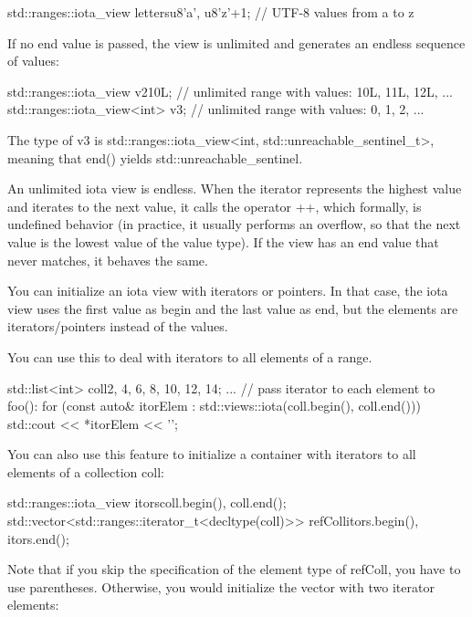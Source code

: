 \begin{cpp}
std::ranges::iota_view letters{u8'a', u8'z'+1}; // UTF-8 values from a to z
\end{cpp}

If no end value is passed, the view is unlimited and generates an endless sequence of values:

\begin{cpp}
std::ranges::iota_view v2{10L}; // unlimited range with values: 10L, 11L, 12L, ...
std::ranges::iota_view<int> v3; // unlimited range with values: 0, 1, 2, ...
\end{cpp}

The type of v3 is std::ranges::iota\_view<int, std::unreachable\_sentinel\_t>, meaning that end() yields std::unreachable\_sentinel.

An unlimited iota view is endless. When the iterator represents the highest value and iterates to the next value, it calls the operator ++, which formally, is undefined behavior (in practice, it usually performs an overflow, so that the next value is the lowest value of the value type). If the view has an end value that never matches, it behaves the same.


You can initialize an iota view with iterators or pointers. In that case, the iota view uses the first value as begin and the last value as end, but the elements are iterators/pointers instead of the values.

You can use this to deal with iterators to all elements of a range.

\begin{cpp}
std::list<int> coll{2, 4, 6, 8, 10, 12, 14};
...
// pass iterator to each element to foo():
for (const auto& itorElem : std::views::iota(coll.begin(), coll.end())) {
	std::cout << *itorElem << '\n';
}
\end{cpp}

You can also use this feature to initialize a container with iterators to all elements of a collection coll:

\begin{cpp}
std::ranges::iota_view itors{coll.begin(), coll.end()};
std::vector<std::ranges::iterator_t<decltype(coll)>> refColl{itors.begin(),
	itors.end()};
\end{cpp}

Note that if you skip the specification of the element type of refColl, you have to use parentheses. Otherwise, you would initialize the vector with two iterator elements:

